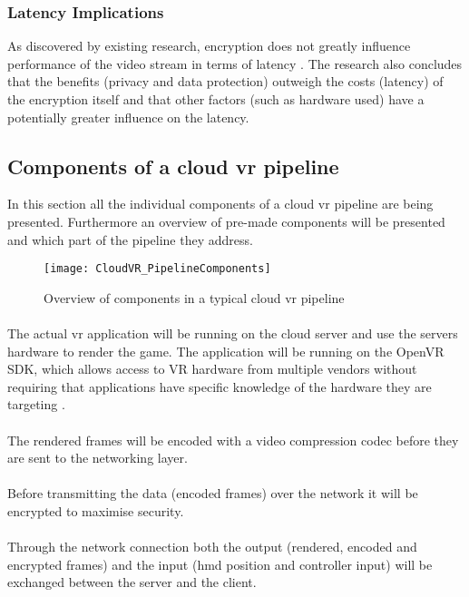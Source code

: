 \subsubsection{Latency Implications}
As discovered by existing research, encryption does not greatly influence performance of the video stream in terms of latency \parencite{Kaknjo_2019}. The research also concludes that the benefits (privacy and data protection) outweigh the costs (latency) of the encryption itself and that other factors (such as hardware used) have a potentially greater influence on the latency.

\subsection{Components of a cloud \acrshort{vr} pipeline}
In this section all the individual components of a cloud \acrshort{vr} pipeline are being presented. Furthermore an overview of pre-made components will be presented and which part of the pipeline they address.

\begin{figure}[h!]
\caption{Overview of components in a typical cloud \acrshort{vr} pipeline}
\label{fig:pipeline}
\texttt{[image: CloudVR\_PipelineComponents]}
\end{figure}


\paragraph{\textSR}
The actual \acrshort{vr} application will be running on the cloud server and use the servers hardware to render the game. The application will be running on the OpenVR SDK, which allows access to VR hardware from multiple vendors without requiring that applications have specific knowledge of the hardware they are targeting \parencite{openvrsdk}. 
\paragraph{\textSECO}
The rendered frames will be encoded with a video compression codec before they are sent to the networking layer.
\paragraph{\textSECR}
Before transmitting the data (encoded frames) over the network it will be encrypted to maximise security.
\paragraph{\textN}
Through the network connection both the output (rendered, encoded and encrypted frames) and the input (\acrshort{hmd} position and controller input) will be exchanged between the server and the client.
